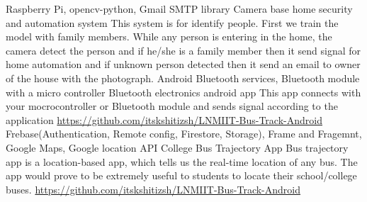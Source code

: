\begin{cventries}
    \cventry
	{Raspberry Pi, opencv-python, Gmail SMTP library}
	{Camera base home security and automation system}
	{}
	{}
	{This system is for identify people. First we train the model with family members. While any person is entering in the home, the camera detect the person and if he/she is a family member then it send signal for home automation and if unknown person detected then it send an email to owner of the house with the photograph. \newline \vspace{1mm}}
	\cventry
	{Android Bluetooth services, Bluetooth module with a micro controller}
	{Bluetooth electronics android app}
	{}
	{}
	{This app connects with your mocrocontroller or Bluetooth module and sends signal according to the application \newline \vspace{1mm}
	\url{https://github.com/itskshitizsh/LNMIIT-Bus-Track-Android}}
	\cventry
	{Frebase(Authentication, Remote config, Firestore, Storage), Frame and Fragemnt, Google Maps, Google location API}
	{College Bus Trajectory App}
	{}
	{}
	{Bus trajectory app is a location-based app, which tells us the real-time location of any bus. The app would prove to be extremely useful to students to locate their school/college buses. \newline \vspace{1mm}
	\url{https://github.com/itskshitizsh/LNMIIT-Bus-Track-Android}}
	
\end{cventries}